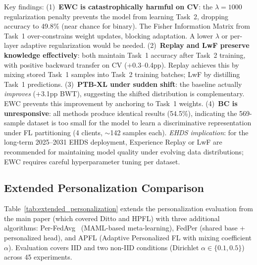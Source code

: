 \documentclass[conference,a4paper]{IEEEtran}
\begin{document}
\begin{table}[htbp]
\vspace{1mm}
\footnotesize{Key findings: (1)~\textbf{EWC is catastrophically harmful on CV}: the $\lambda{=}1000$ regularization penalty prevents the model from learning Task~2, dropping accuracy to 49.8\% (near chance for binary). The Fisher Information Matrix from Task~1 over-constrains weight updates, blocking adaptation. A lower $\lambda$ or per-layer adaptive regularization would be needed. (2)~\textbf{Replay and LwF preserve knowledge effectively}: both maintain Task~1 accuracy after Task~2 training, with positive backward transfer on CV ($+$0.3--0.4pp). Replay achieves this by mixing stored Task~1 samples into Task~2 training batches; LwF by distilling Task~1 predictions. (3)~\textbf{PTB-XL under sudden shift}: the baseline actually \textit{improves} ($+$3.1pp BWT), suggesting the shifted distribution is complementary. EWC prevents this improvement by anchoring to Task~1 weights. (4)~\textbf{BC is unresponsive}: all methods produce identical results (54.5\%), indicating the 569-sample dataset is too small for the model to learn a discriminative representation under FL partitioning (4 clients, $\sim$142 samples each). \textit{EHDS implication}: for the long-term 2025--2031 EHDS deployment, Experience Replay or LwF are recommended for maintaining model quality under evolving data distributions; EWC requires careful hyperparameter tuning per dataset.}
\end{table}

\subsection{Extended Personalization Comparison}
\label{sec:extended_pers_exp}

Table~\ref{tab:extended_personalization} extends the personalization evaluation from the main paper (which covered Ditto and HPFL) with three additional algorithms: Per-FedAvg~\cite{fallah2020personalized} (MAML-based meta-learning), FedPer (shared base + personalized head), and APFL (Adaptive Personalized FL with mixing coefficient $\alpha$). Evaluation covers IID and two non-IID conditions (Dirichlet $\alpha \in \{0.1, 0.5\}$) across 45 experiments.
\end{document}
